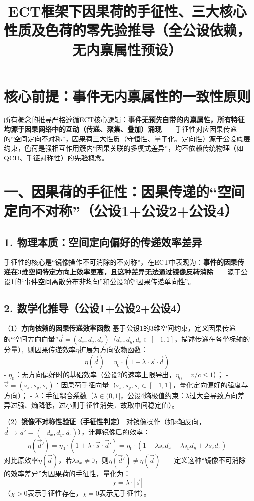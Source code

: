 \documentclass{article}
\title{ECT框架下因果荷的手征性、三大核心性质及色荷的零先验推导（全公设依赖，无内禀属性预设）}
\author{}
\date{}
\begin{document}
\maketitle

\section*{核心前提：事件无内禀属性的一致性原则}
所有概念的推导严格遵循ECT核心逻辑：\textbf{事件无预先自带的内禀属性，所有特征均源于因果网络中的互动（传递、聚集、叠加）涌现}——手征性对应因果传递的“空间定向不对称”，因果荷三大性质（守恒性、量子化、定向性）源于公设底层约束，色荷是强相互作用簇内“因果关联的多模式差异”，均不依赖传统物理（如QCD、手征对称性）的先验概念。


\section*{一、因果荷的手征性：因果传递的“空间定向不对称”（公设1+公设2+公设4）}

\subsection*{1. 物理本质：空间定向偏好的传递效率差异}
手征性的核心是“镜像操作不可消除的不对称”，在ECT中表现为：\textbf{事件的因果传递在3维空间特定方向上效率更高，且这种差异无法通过镜像反转消除}——源于公设1的“事件空间离散分布非均匀”和公设2的“因果传递单向性”。

\subsection*{2. 数学化推导（公设1+公设2+公设4）}
（1）\textbf{方向依赖的因果传递效率函数}  
基于公设1的3维空间约束，定义因果传递的“空间方向向量”\(\vec{d} = (d_x, d_y, d_z)\)（\(d_x,d_y,d_z \in [-1,1]\)，描述传递在各坐标轴的分量），则因果传递效率\(\eta\)扩展为方向依赖函数：
\[
\boxed{\eta(\vec{d}) = \eta_0 \cdot (1 + \lambda \cdot \vec{s} \cdot \vec{d})}
\]
- \(\eta_0\)：无方向偏好时的基础效率（公设2的速率上限导出，\(\eta_0 = v/c \leq 1\)）；  
- \(\vec{s} = (s_x, s_y, s_z)\)：因果荷手征向量（\(s_x,s_y,s_z \in [-1,1]\)，量化定向偏好的强度与方向）；  
- \(\lambda\)：手征耦合系数（\(\lambda \in (0,1]\)，公设4熵极值约束：\(\lambda\)过大会导致方向差异过强、熵降低，过小则手征性消失，故取中间稳定值）。

（2）\textbf{镜像不对称性验证（手征性判定）}  
对镜像操作（如\(x\)轴反向，\(\vec{d} \to \vec{d}' = (-d_x, d_y, d_z)\)），计算镜像后的效率：
\[
\eta(\vec{d}') = \eta_0 \cdot (1 + \lambda \cdot \vec{s} \cdot \vec{d}') = \eta_0 \cdot \left(1 - \lambda s_x d_x + \lambda s_y d_y + \lambda s_z d_z\right)
\]
对比原效率\(\eta(\vec{d})\)，若\(\lambda s_x \neq 0\)，则\(\eta(\vec{d}') \neq \eta(\vec{d})\)——定义这种“镜像不可消除的效率差异”为因果荷的手征性，量化为：
\[
\boxed{\chi = \lambda \cdot |\vec{s}|}
\]
（\(\chi > 0\)表示手征性存在，\(\chi = 0\)表示无手征性）。
\end{document}
